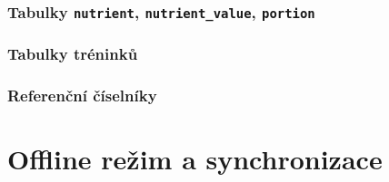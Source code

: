 \subsubsection{Tabulky \texttt{nutrient}, \texttt{nutrient\_value}, \texttt{portion}}

\subsubsection{Tabulky tréninků}

\subsubsection{Referenční číselníky}

\section{Offline režim a synchronizace}
\label{sec:offline}

